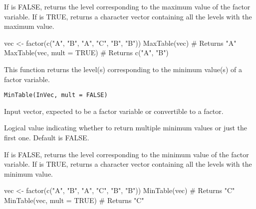 \documentclass[a4paper]{book}
\begin{document}
%
\begin{Value}
If  is FALSE, returns the level corresponding to the maximum value of the factor variable.
If  is TRUE, returns a character vector containing all the levels with the maximum value.
\end{Value}
%
\begin{Examples}
\begin{ExampleCode}
vec <- factor(c("A", "B", "A", "C", "B", "B"))
MaxTable(vec) # Returns "A"
MaxTable(vec, mult = TRUE) # Returns c("A", "B")
\end{ExampleCode}
\end{Examples}
%
\begin{Description}
This function returns the level(s) corresponding to the minimum value(s) of a factor variable.
\end{Description}
%
\begin{Usage}
\begin{verbatim}
MinTable(InVec, mult = FALSE)
\end{verbatim}
\end{Usage}
%
\begin{Arguments}
\begin{ldescription}
\item[\code{InVec}] Input vector, expected to be a factor variable or convertible to a factor.

\item[\code{mult}] Logical value indicating whether to return multiple minimum values or just the first one. Default is FALSE.
\end{ldescription}
\end{Arguments}
%
\begin{Value}
If  is FALSE, returns the level corresponding to the minimum value of the factor variable.
If  is TRUE, returns a character vector containing all the levels with the minimum value.
\end{Value}
%
\begin{Examples}
\begin{ExampleCode}
vec <- factor(c("A", "B", "A", "C", "B", "B"))
MinTable(vec) # Returns "C"
MinTable(vec, mult = TRUE) # Returns "C"
\end{ExampleCode}
\end{Examples}
\end{document}
